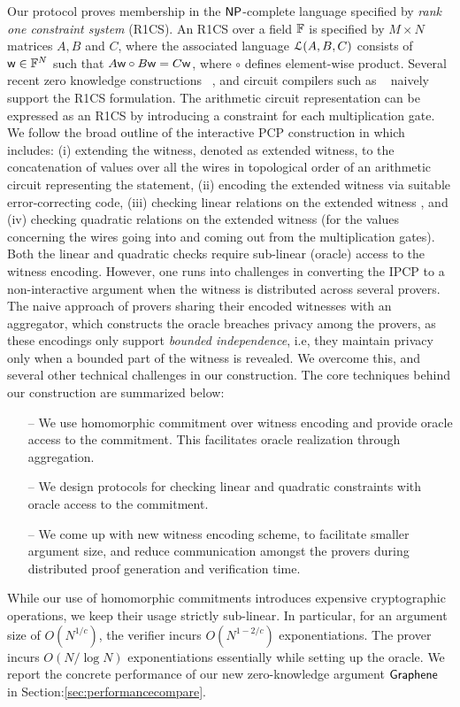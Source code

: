 Our protocol proves membership in the $\mathsf{NP}$-complete language specified by {\em rank one constraint system} (R1CS). An R1CS over a field $\mathbb{F}$ is specified by $M\times N$ matrices $A,B$ and $C$, where the associated language $\mathcal{L}(A,B,C)$ consists of $\mathsf{w}\in \mathbb{F}^N$ such that $A\mathsf{w}\circ B\mathsf{w}=C\mathsf{w}$, where $\circ$ defines element-wise product. Several
recent zero knowledge constructions ~\cite{Groth16,aurora,marlin}, and circuit compilers such as ~\cite{zokrates} naively support the R1CS formulation. 
The arithmetic circuit representation can be expressed as an R1CS by introducing a constraint for each multiplication gate. We follow the broad outline of the interactive PCP
construction in \cite{ligero} which includes: (i) extending the witness, denoted as extended witness, to the concatenation of values over all the wires in topological order of an arithmetic circuit representing the statement, (ii) encoding the extended witness via suitable error-correcting code, (iii) checking linear relations on the extended witness%
, and (iv) checking quadratic relations on the extended witness  (for the values concerning the wires going into and coming out from the multiplication gates). Both the linear and quadratic checks require sub-linear (oracle) access to the witness encoding.
However, one runs into challenges in converting the IPCP to a non-interactive argument when the witness is distributed across several provers. The naive approach of provers sharing their encoded witnesses with an aggregator, which constructs the oracle breaches privacy among the provers, as these encodings only support {\em bounded independence}, i.e, they maintain privacy only when a bounded part of the witness is revealed. We overcome this, and several other technical challenges in our construction. The core techniques behind our
construction are summarized below:
\begin{itemize}
	\item[--] We use homomorphic commitment over witness encoding and provide oracle access to the commitment. This facilitates oracle realization through aggregation.
	\item[--] We design protocols for checking linear and quadratic constraints with oracle access to the commitment.
	\item[--] We come up with new witness encoding scheme, to facilitate smaller argument size, and reduce communication amongst the provers during distributed proof generation and verification time.
\end{itemize}
While our use of homomorphic commitments introduces expensive cryptographic operations, we keep their usage strictly sub-linear. In particular, for an argument size of $O(N^{1/c})$, the verifier incurs $O(N^{1-2/c})$ exponentiations. The prover incurs $O(N/\log N)$ exponentiations essentially while setting up the oracle. We report the concrete performance of our new zero-knowledge argument $\textsf{Graphene}$ in Section:\ref{sec:performancecompare}.

